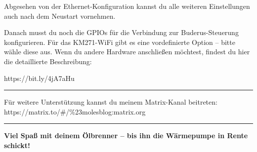 \documentclass[
  9pt,
]{extarticle}
\makeatletter
\newcommand*\pandocbounded[1]{%
  \sbox\pandoc@box{#1}%
  \Gscale@div\@tempa{\textheight}{\dimexpr\ht\pandoc@box+\dp\pandoc@box\relax}%
  \Gscale@div\@tempb{\linewidth}{\wd\pandoc@box}%
  \ifdim\@tempb\p@<\@tempa\p@\let\@tempa\@tempb\fi%
  \ifdim\@tempa\p@<\p@\scalebox{\@tempa}{\usebox\pandoc@box}%
  \else\usebox{\pandoc@box}%
  \fi%
}
\makeatother
\begin{document}
Abgesehen von der Ethernet-Konfiguration kannst du alle weiteren
Einstellungen auch nach dem Neustart vornehmen.

Danach musst du noch die GPIOs für die Verbindung zur Buderus-Steuerung
konfigurieren. Für das KM271-WiFi gibt es eine vordefinierte Option --
bitte wähle diese aus. Wenn du andere Hardware anschließen möchtest,
findest du hier die detaillierte Beschreibung:

\href{https://bit.ly/4jA7aHu}{\pandocbounded{\texttt{[image: https://api.qrserver.com/v1/create-qr-code/?data=https\\\%3A\\\%2F\\\%2Fbit.ly\\\%2F4jA7aHu\&size=150x150]}}}

https://bit.ly/4jA7aHu

\begin{center}\rule{0.5\linewidth}{0.5pt}\end{center}

Für weitere Unterstützung kannst du meinem Matrix-Kanal beitreten:\\
https://matrix.to/\#/\%23molesblog:matrix.org

\begin{center}\rule{0.5\linewidth}{0.5pt}\end{center}

\textbf{Viel Spaß mit deinem Ölbrenner -- bis ihn die Wärmepumpe in
Rente schickt!}
\end{document}

